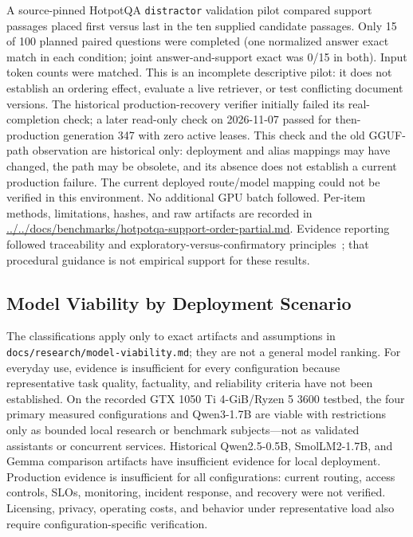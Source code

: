 \documentclass[10pt,a4paper,twocolumn]{article}
\begin{document}
A source-pinned HotpotQA \texttt{distractor} validation pilot compared support passages placed first versus last in the ten supplied candidate passages. Only 15 of 100 planned paired questions were completed (one normalized answer exact match in each condition; joint answer-and-support exact was 0/15 in both). Input token counts were matched. This is an incomplete descriptive pilot: it does not establish an ordering effect, evaluate a live retriever, or test conflicting document versions. The historical production-recovery verifier initially failed its real-completion check; a later read-only check on 2026-11-07 passed for then-production generation 347 with zero active leases. This check and the old GGUF-path observation are historical only: deployment and alias mappings may have changed, the path may be obsolete, and its absence does not establish a current production failure. The current deployed route/model mapping could not be verified in this environment. No additional GPU batch followed. Per-item methods, limitations, hashes, and raw artifacts are recorded in \url{../../docs/benchmarks/hotpotqa-support-order-partial.md}. Evidence reporting followed traceability and exploratory-versus-confirmatory principles~\cite{kassis2026skills}; that procedural guidance is not empirical support for these results.

\subsection{Model Viability by Deployment Scenario}

The classifications apply only to exact artifacts and assumptions in \texttt{docs/research/model-viability.md}; they are not a general model ranking. For everyday use, evidence is insufficient for every configuration because representative task quality, factuality, and reliability criteria have not been established. On the recorded GTX 1050 Ti 4-GiB/Ryzen 5 3600 testbed, the four primary measured configurations and Qwen3-1.7B are viable with restrictions only as bounded local research or benchmark subjects—not as validated assistants or concurrent services. Historical Qwen2.5-0.5B, SmolLM2-1.7B, and Gemma comparison artifacts have insufficient evidence for local deployment. Production evidence is insufficient for all configurations: current routing, access controls, SLOs, monitoring, incident response, and recovery were not verified. Licensing, privacy, operating costs, and behavior under representative load also require configuration-specific verification.
\end{document}
